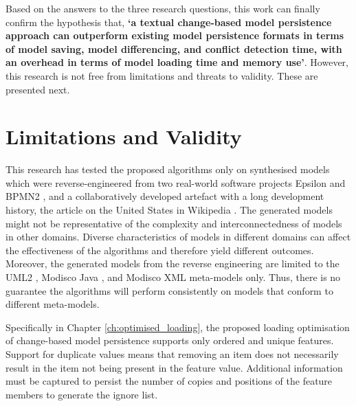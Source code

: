 Based on the answers to the three research questions, this work can finally confirm the hypothesis that,
\textbf{‘a textual change-based model persistence approach can outperform existing model persistence formats in terms of model saving, model differencing, and conflict detection time, with an overhead in terms of model loading time and memory use’}. However, this research is not free from limitations and threats to validity. These are presented next.

\section{Limitations and Validity}
\label{sec:limitation_and_Threat_to_validity}
This research has tested the proposed algorithms only on synthesised models which were reverse-engineered from two real-world software projects Epsilon \cite{eclipse2018epsilongit} and BPMN2 \cite{eclipse2018bpmn2git}, and a collaboratively developed artefact with a long development history, the article on the United States in Wikipedia \cite{wikipedia2018us}. The generated models might not be representative of the complexity and interconnectedness of models in other domains. Diverse characteristics of models in different domains can affect the effectiveness of the algorithms and therefore yield different outcomes. Moreover, the generated models from the reverse engineering are limited to the UML2 \cite{eclipse2017uml2}, Modisco Java \cite{eclipse2018modiscojava}, and Modisco XML \cite{eclipse2018modiscoxml} meta-models only. Thus, there is no guarantee the algorithms will perform consistently on models that conform to different meta-models.

Specifically in Chapter \ref{ch:optimised_loading}, the proposed loading optimisation of change-based model persistence supports only ordered and unique features. Support for duplicate values means that removing an item does not necessarily result in the item not being present in the feature value. Additional information must be captured to persist the number of copies and positions of the feature members to generate the ignore list.

